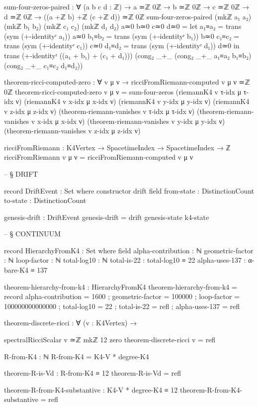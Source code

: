 \documentclass[11pt,a4paper]{book}
\begin{document}
\begin{code}
sum-four-zeros-paired : ∀ (a b c d : ℤ) → a ≃ℤ 0ℤ → b ≃ℤ 0ℤ → c ≃ℤ 0ℤ → d ≃ℤ 0ℤ →
                        ((a +ℤ b) +ℤ (c +ℤ d)) ≃ℤ 0ℤ
sum-four-zeros-paired (mkℤ a₁ a₂) (mkℤ b₁ b₂) (mkℤ c₁ c₂) (mkℤ d₁ d₂) a≃0 b≃0 c≃0 d≃0 = 
  let a₁≡a₂ = trans (sym (+-identityʳ a₁)) a≃0
      b₁≡b₂ = trans (sym (+-identityʳ b₁)) b≃0
      c₁≡c₂ = trans (sym (+-identityʳ c₁)) c≃0
      d₁≡d₂ = trans (sym (+-identityʳ d₁)) d≃0
  in trans (+-identityʳ ((a₁ + b₁) + (c₁ + d₁)))
           (cong₂ _+_ (cong₂ _+_ a₁≡a₂ b₁≡b₂) (cong₂ _+_ c₁≡c₂ d₁≡d₂))

theorem-ricci-computed-zero : ∀ v μ ν → ricciFromRiemann-computed v μ ν ≃ℤ 0ℤ
theorem-ricci-computed-zero v μ ν = 
  sum-four-zeros 
    (riemannK4 v τ-idx μ τ-idx ν)
    (riemannK4 v x-idx μ x-idx ν)
    (riemannK4 v y-idx μ y-idx ν)
    (riemannK4 v z-idx μ z-idx ν)
    (theorem-riemann-vanishes v τ-idx μ τ-idx ν)
    (theorem-riemann-vanishes v x-idx μ x-idx ν)
    (theorem-riemann-vanishes v y-idx μ y-idx ν)
    (theorem-riemann-vanishes v z-idx μ z-idx ν)

ricciFromRiemann : K4Vertex → SpacetimeIndex → SpacetimeIndex → ℤ
ricciFromRiemann v μ ν = ricciFromRiemann-computed v μ ν


-- § DRIFT

record DriftEvent : Set where
  constructor drift
  field
    from-state : DistinctionCount
    to-state   : DistinctionCount

genesis-drift : DriftEvent
genesis-drift = drift genesis-state k4-state


-- § CONTINUUM

record HierarchyFromK4 : Set where
  field
    alpha-contribution : ℕ
    geometric-factor : ℕ
    loop-factor : ℕ
    total-log10 : ℕ
    total-is-22 : total-log10 ≡ 22
    alpha-uses-137 : α-bare-K4 ≡ 137

theorem-hierarchy-from-k4 : HierarchyFromK4
theorem-hierarchy-from-k4 = record
  { alpha-contribution = 1600
  ; geometric-factor = 100000
  ; loop-factor = 100000000000000
  ; total-log10 = 22
  ; total-is-22 = refl
  ; alpha-uses-137 = refl
  }

theorem-discrete-ricci : ∀ (v : K4Vertex) → 

  spectralRicciScalar v ≃ℤ mkℤ 12 zero
theorem-discrete-ricci v = refl

R-from-K4 : ℕ
R-from-K4 = K4-V * degree-K4

theorem-R-is-Vd : R-from-K4 ≡ 12
theorem-R-is-Vd = refl

theorem-R-from-K4-substantive : K4-V * degree-K4 ≡ 12
theorem-R-from-K4-substantive = refl


\end{code}
\end{document}
